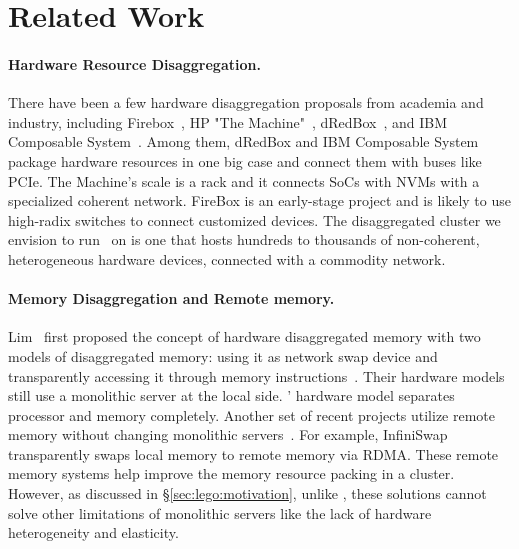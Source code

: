 \section{Related Work}
\label{sec:lego:related}

\paragraph{Hardware Resource Disaggregation.}
There have been a few hardware disaggregation proposals from academia and industry,
including Firebox~\cite{FireBox-FASTKeynote}, HP "The Machine"~\cite{HP-TheMachine,HP-MemoryOS}, dRedBox~\cite{dRedBox-DATE},
and IBM Composable System~\cite{IBM-Composable}.
Among them, dRedBox and IBM Composable System package hardware resources in one big case 
and connect them with buses like PCIe.
The Machine's scale is a rack and it connects SoCs with NVMs with a specialized coherent network.
FireBox is an early-stage project and is likely to use high-radix switches to connect  customized devices.
The disaggregated cluster we envision to run \lego\ on is one that hosts hundreds to thousands of
non-coherent, heterogeneous hardware devices, connected with a commodity network.

\paragraph{Memory Disaggregation and Remote memory.}
Lim \etal\ first proposed the concept of hardware disaggregated memory
with two models of disaggregated memory: using it as network swap device 
and transparently accessing it through memory instructions~\cite{Lim09-disaggregate,Lim12-HPCA}.
Their hardware models still use a monolithic server at the local side. 
\lego' hardware model separates processor and memory completely. %
%
Another set of recent projects utilize remote memory without changing 
monolithic servers~\cite{Dragojevic14-FaRM,Nelson15-ATC,remote-region-atc18,GU17-NSDI,Novakovic16-SOCC,hotpot-socc17}.
For example, InfiniSwap~\cite{GU17-NSDI} transparently swaps local memory to remote memory via RDMA.
These remote memory systems help improve the memory resource packing in a cluster.
However, as discussed in \S\ref{sec:lego:motivation}, unlike \lego, these solutions cannot solve other limitations 
of monolithic servers like the lack of hardware heterogeneity and elasticity. 


